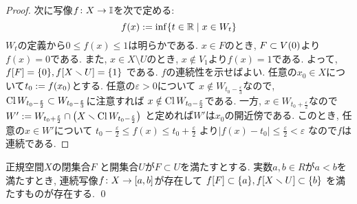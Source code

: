 \documentclass[uplatex, dvipdfmx, a4paper, 12pt, class=jsbook, crop=false]{standalone}
\begin{document}
\begin{proof}
	次に写像\( f\colon X\to\mathbb{I} \)を次で定める:
	\[ f(x) \defeq \inf  \setcomp{t \in \R}{x \in W_t} \]
	\( W_t \)の定義から\( 0 \leq f(x) \leq 1 \)は明らかである.
	\( x \in F \)のとき, \( F \subset V\lrparen{0} \)より\( f(x) = 0 \)である.
	また, \( x \in X \setminus U \)のとき, \( x \notin V_1 \)より\( f(x) = 1 \)である.
	よって, \( \mapset{f}{F} = \lrbrace{0}, \mapset{f}{X \setminus U} = \lrbrace{1} \)
	である.
	\( f \)の連続性を示せばよい.
	任意の\( x_0 \in X \)について\( t_0 \mathrel{:=} f(x_0) \)とする.
	任意の\( \varepsilon > 0 \)について
	\( x \notin W_{t_0 - \frac{\varepsilon}{3}} \)なので,
	\( \mathop{\mathrm{Cl}}\nolimits W_{t_0 - \frac{\varepsilon}{2}} \subset
	W_{t_0 - \frac{\varepsilon}{3}} \)に注意すれば
	\( x \notin \mathop{\mathrm{Cl}}\nolimits W_{t_0 - \frac{\varepsilon}{2}} \)である.
	一方, \( x \in W_{t_0 + \frac{\varepsilon}{2}} \)なので
	\( W' \defeq W_{t_0 + \frac{\varepsilon}{2}} \cap
	\lrparen{X \setminus \topcl W_{t_0 - \frac{\varepsilon}{2}}} \)
	と定めれば\( W' \)は\( x_0 \)の開近傍である.
	このとき, 任意の\( x \in W' \)について
	\( t_0 - \frac{\varepsilon}{2} \leq f(x) \leq t_0 + \frac{\varepsilon}{2} \)
	より\( |f(x) - t_0| \leq \frac{\varepsilon}{2} < \varepsilon \)
	なので\( f \)は連続である.
\end{proof}

\begin{corollary}
	正規空間\( X \)の閉集合\( F \)
	と開集合\( U \)が\( F \subset U \)を満たすとする.
	実数\( a, b \in R \)が\( a < b \)を満たすとき,
	連続写像\( f\colon X\to[a,b] \)が存在して
	\( \mapset{f}{F} \subset \lrbrace{a},
	\mapset{f}{X \setminus U} \subset \lrbrace{b} \)
	を満たすものが存在する.
	\qed
\end{corollary}
\end{document}
